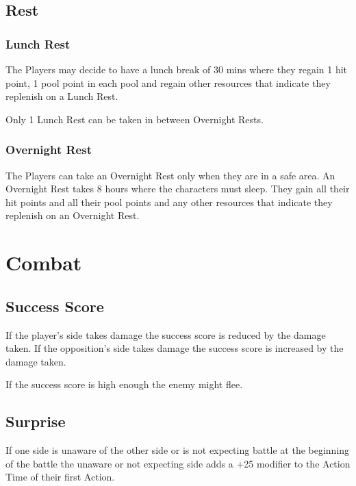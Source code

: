 \documentclass[a4paper,12pt,oneside]{book}
\begin{document}
            \subsection{Rest}
                \subsubsection{Lunch Rest}
                    The Players may decide to have a lunch break of 30 mins where they regain 1 hit point, 1 pool point in each pool and regain other resources that indicate they replenish on a Lunch Rest.

                    Only 1 Lunch Rest can be taken in between Overnight Rests.
                \subsubsection{Overnight Rest}
                    The Players can take an Overnight Rest only when they are in a safe area. An Overnight Rest takes 8 hours where the characters must sleep. They gain all their hit points and all their pool points and any other resources that indicate they replenish on an Overnight Rest.
        
        \section{Combat}
            \subsection{Success Score}
                If the player's side takes damage the success score is reduced by the damage taken. If the opposition's side takes damage the success score is increased by the damage taken.

                If the success score is high enough the enemy might flee.

            \subsection{Surprise}
                If one side is unaware of the other side or is not expecting battle at the beginning of the battle the unaware or not expecting side adds a +25 modifier to the Action Time of their first Action.

\end{document}
